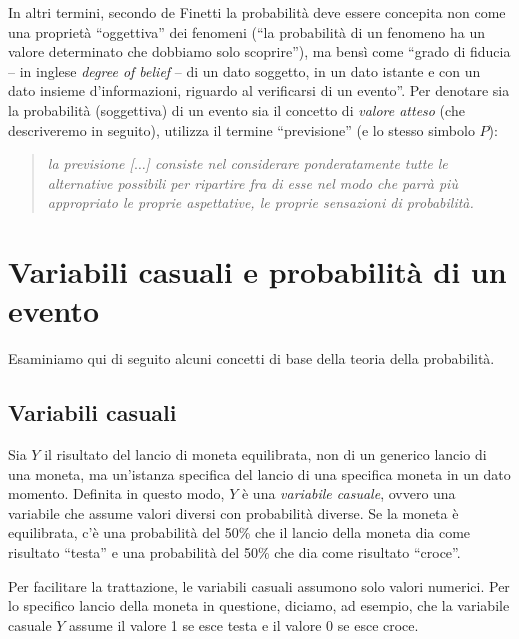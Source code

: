 \documentclass[
  10pt,
  italian,
  a4paper,
  extrafontsizes,onecolumn,openright
  ]{memoir}
\theoremstyle{definition}
\theoremstyle{definition}
\theoremstyle{definition}
\theoremstyle{definition}
\theoremstyle{remark}
\begin{document}
In altri termini, secondo de Finetti la probabilità deve essere concepita non come una proprietà ``oggettiva'' dei fenomeni (``la probabilità di un fenomeno ha un valore determinato che dobbiamo solo scoprire''), ma bensì come ``grado di fiducia -- in inglese \emph{degree of belief} -- di un dato soggetto, in un dato istante e con un dato insieme d'informazioni, riguardo al verificarsi di un evento''. Per denotare sia la probabilità (soggettiva) di un evento sia il concetto di \emph{valore atteso} (che descriveremo in seguito), \textcite{definetti1970teoria} utilizza il termine ``previsione'' (e lo stesso simbolo \(P\)):

\begin{quote}
\emph{la previsione {[}\(\dots\){]} consiste nel considerare ponderatamente tutte le alternative possibili per ripartire fra di esse nel modo che parrà più appropriato le proprie aspettative, le proprie sensazioni di probabilità.}
\end{quote}

\hypertarget{variabili-casuali-e-probabilituxe0-di-un-evento}{%
\section{Variabili casuali e probabilità di un evento}\label{variabili-casuali-e-probabilituxe0-di-un-evento}}

Esaminiamo qui di seguito alcuni concetti di base della teoria della probabilità.

\hypertarget{variabili-casuali}{%
\subsection{Variabili casuali}\label{variabili-casuali}}

Sia \(Y\) il risultato del lancio di moneta equilibrata, non di un generico lancio di una moneta, ma un'istanza specifica del lancio di una specifica moneta in un dato momento. Definita in questo modo, \(Y\) è una \emph{variabile casuale}, ovvero una variabile che assume valori diversi con probabilità diverse. Se la moneta è equilibrata, c'è una probabilità del 50\% che il lancio della moneta dia come risultato ``testa'' e una probabilità del 50\% che dia come risultato ``croce''.

Per facilitare la trattazione, le variabili casuali assumono solo valori numerici. Per lo specifico lancio della moneta in questione, diciamo, ad esempio, che la variabile casuale \(Y\) assume il valore 1 se esce testa e il valore 0 se esce croce.
\end{document}
